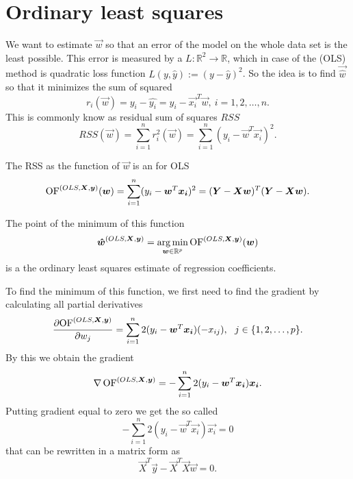 \section{Ordinary least squares}
We want to estimate $\vec{w}$ so that an error of the model on the whole data set is the least possible. This error is measured by a  
$L : \mathbb{R}^2 \rightarrow  \mathbb{R}$,
which in case of the  (OLS) method is quadratic loss function $L(y, \hat{y}) := (y - \hat{y})^2$. 
So the idea is to find $\vec{\hat{w}}$ so that it minimizes the sum of squared 
\begin{equation}
    r_i(\vec{w}) =y_i - \hat{y_i} = y_i - \vec{x_i}^T\vec{w} ,\ i = 1,2,\ldots ,n.
\end{equation}
This is commonly know as residual sum of squares $RSS$
\begin{equation}
    RSS(\vec{w}) = \sum\limits_{i=1}^n r_i^2(\vec{w}) = \sum\limits_{i=1}^n (y_i - \vec{w}^T\vec{x_i})^2.
\end{equation}
\begin{definition} The RSS as the function of $\vec{w}$ is an  for OLS
    \begin{equation}
        \operatorname{OF}^{(OLS,\boldsymbol{X}, \boldsymbol{y})}(\boldsymbol{w}) = \sum\limits_{i=1}^n (y_i - \boldsymbol{w}^T\boldsymbol{x_i})^2 = (\boldsymbol{Y} - \boldsymbol{X}\boldsymbol{w})^T(\boldsymbol{Y} - \boldsymbol{X}\boldsymbol{w}).
    \end{equation}
\end{definition}
The point of the minimum of this function 
\begin{equation}
\boldsymbol{\hat{w}}^{(OLS,\boldsymbol{X}, \boldsymbol{y})}  = \operatorname*{arg\,min}_{\boldsymbol{w} \in \mathbb{R}^p} \operatorname{OF}^{(OLS,\boldsymbol{X}, \boldsymbol{y})}(\boldsymbol{w})
\end{equation}
is a the ordinary least squares estimate of regression coefficients.

To find the minimum of this function, we first need to find the gradient by calculating all partial derivatives
\begin{equation}
    \frac{\partial {\operatorname{OF}^{(OLS,\boldsymbol{X}, \boldsymbol{y})}} }{\partial w_j} = \sum\limits_{i=1}^n 2(y_i - \boldsymbol{w}^T\boldsymbol{x_i})(-x_{ij}) \\, \ \ j \in \{{1,2,\ldots,p\}}. 
\end{equation}
By this we obtain the gradient 
\begin{equation}
    \nabla \operatorname{OF}^{(OLS,\boldsymbol{X}, \boldsymbol{y})} = -\sum\limits_{i=1}^n 2(y_i - \boldsymbol{w}^T\boldsymbol{x_i})\boldsymbol{x_i}. 
\end{equation}
Putting gradient equal to zero we get the so called 
\begin{equation}
    -\sum\limits_{i=1}^n 2(y_i - \vec{w}^T\vec{x_i})\vec{x_i} = 0 
\end{equation}
that can be rewritten in a matrix form as 
\begin{equation}    \label{equation:zerogradient}
    \vec{X}^T\vec{y} - \vec{X}^T\vec{X}\vec{w} = 0.
\end{equation}

